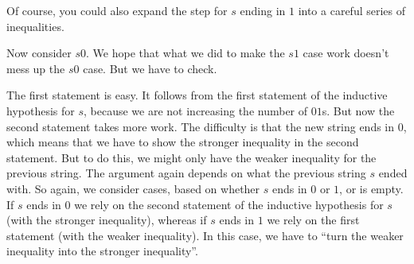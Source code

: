 \begin{definition}
\begin{staffnotes}
Of course, you could also expand the step for $s$ ending in $1$ into a
careful series of inequalities.

Now consider $s0$.  We hope that what we did to make the $s1$ case
work doesn't mess up the $s0$ case.  But we have to check.

The first statement is easy.  It follows from the first statement of
the inductive hypothesis for $s$, because we are not increasing the
number of $01$s.  But now the second statement takes more work.  The
difficulty is that the new string ends in $0$, which means that we
have to show the stronger inequality in the second statement.  But to
do this, we might only have the weaker inequality for the previous
string.  The argument again depends on what the previous string $s$
ended with.  So again, we consider cases, based on whether $s$ ends in
$0$ or $1$, or is empty.  If $s$ ends in $0$ we rely on the second
statement of the inductive hypothesis for $s$ (with the stronger
inequality), whereas if $s$ ends in $1$ we rely on the first statement
(with the weaker inequality).  In this case, we have to ``turn the
weaker inequality into the stronger inequality''.

\iffalse
{}
\end{staffnotes}
\end{definition}
